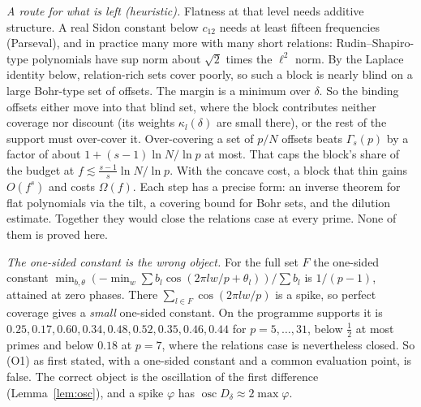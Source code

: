 \documentclass[11pt]{article}
\theoremstyle{definition}
\begin{document}
\emph{A route for what is left (heuristic).}  Flatness at that level needs additive structure.  A real Sidon constant below $c_{12}$ needs at least
fifteen frequencies (Parseval), and in practice many more with many short relations: Rudin--Shapiro-type polynomials have sup norm about $\sqrt2$ times
the $\ell^2$ norm.  By the Laplace identity below, relation-rich sets cover poorly, so such a block is
nearly blind on a large Bohr-type set of offsets.  The margin is a minimum over $\delta$.  So the binding offsets either move into that blind set, where the block contributes
neither coverage nor discount (its weights $\kappa_l(\delta)$ are small there), or the rest of the support must over-cover it.  Over-covering a set of
$p/N$ offsets beats $\Gamma_s(p)$ by a factor of about $1+(s-1)\ln N/\ln p$ at most.  That caps the block's share of the budget at
$f\lesssim\frac{s-1}s\ln N/\ln p$.  With the concave cost, a block that thin gains $O(f^s)$ and costs $\Omega(f)$.  Each step has a precise form: an inverse theorem
for flat polynomials via the tilt, a covering bound for Bohr sets, and the dilution estimate.  Together they would close the relations case at
every prime.  None of them is proved here.

\emph{The one-sided constant is the wrong object.}  For the full set $F$ the one-sided constant $\min_{b,\theta}(-\min_w\sum b_l\cos(2\pi lw/p+\theta_l))/\sum b_l$ is
$1/(p-1)$, attained at zero phases.  There $\sum_{l\in F}\cos(2\pi lw/p)$ is a spike, so perfect coverage gives a \emph{small} one-sided constant.  On the
programme supports it is $0.25,0.17,0.60,0.34,0.48,0.52,0.35,0.46,0.44$ for $p=5,\dots,31$, below $\frac12$ at most primes and below $0.18$ at $p=7$, where the
relations case is nevertheless closed.  So (O1) as first stated, with a one-sided constant and a common evaluation point, is false.  The correct object is
the oscillation of the first difference (Lemma~\ref{lem:osc}), and a spike $\varphi$ has $\operatorname{osc}D_\delta\approx2\max\varphi$.
\end{document}
